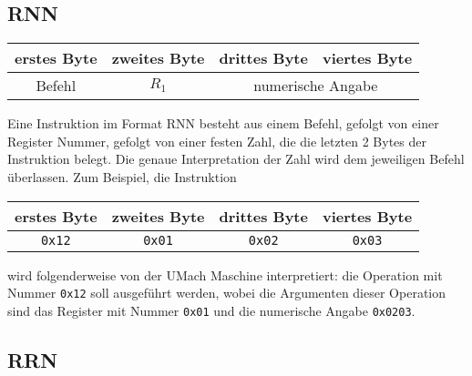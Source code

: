 \subsection{RNN}
\label{subsec:RNN}

\begin{center}
  \begin{tabular}{|*{4}{c|}} \hline
    erstes Byte & zweites Byte  & drittes Byte  & viertes Byte   \\\hline\hline
    Befehl      & $R_{1}$ & \multicolumn{2}{c|}{numerische Angabe} \\\hline
  \end{tabular}
\end{center}

Eine Instruktion im Format RNN besteht aus einem Befehl, gefolgt von einer
Register Nummer, gefolgt von einer festen Zahl, die die letzten 2 Bytes der
Instruktion belegt. Die genaue Interpretation der Zahl wird dem jeweiligen
Befehl überlassen.
Zum Beispiel, die Instruktion
\begin{center}
  \begin{tabular}{|*{4}{c|}} \hline
    erstes Byte & zweites Byte  & drittes Byte  & viertes Byte \\\hline\hline
    \texttt{0x12} & \texttt{0x01} & \texttt{0x02} & \texttt{0x03} \\\hline
  \end{tabular}
\end{center}
wird folgenderweise von der UMach Maschine interpretiert: die Operation mit
Nummer \texttt{0x12} soll ausgeführt werden, wobei die Argumenten dieser
Operation sind das Register mit Nummer \texttt{0x01} und die numerische
Angabe \texttt{0x0203}.



\subsection{RRN}
\label{subsec:RRN}

